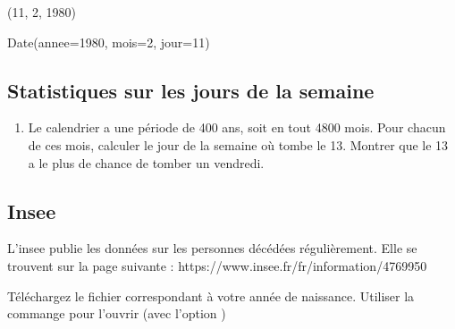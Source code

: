 \documentclass[letterpaper,10pt,english]{sphinxhowto}
\begin{document}
\begin{sphinxVerbatim}[commandchars=\\\{\}]
\end{sphinxVerbatim}

\begin{sphinxVerbatim}[commandchars=\\\{\}]
(11, 2, 1980)
\end{sphinxVerbatim}

\begin{sphinxVerbatim}[commandchars=\\\{\}]
Date(annee=1980, mois=2, jour=11)
\end{sphinxVerbatim}


\subsection{Statistiques sur les jours de la semaine}
\label{\detokenize{devoir_maison_Devoir Maison:statistiques-sur-les-jours-de-la-semaine}}\begin{enumerate}
%
\setcounter{enumi}{14}
\item {} 
\sphinxAtStartPar
Le calendrier a une période de 400 ans, soit en tout 4800 mois. Pour chacun de ces mois, calculer le jour de la semaine où tombe le 13. Montrer que le 13 a le plus de chance de tomber un vendredi.

\end{enumerate}


\subsection{Insee}
\label{\detokenize{devoir_maison_Devoir Maison:insee}}
\sphinxAtStartPar
L’insee publie les données sur les personnes décédées régulièrement. Elle se trouvent sur la page suivante : https://www.insee.fr/fr/information/4769950

\sphinxAtStartPar
Téléchargez le fichier correspondant à votre année de naissance. Utiliser la commange  pour l’ouvrir (avec l’option )
\end{document}

